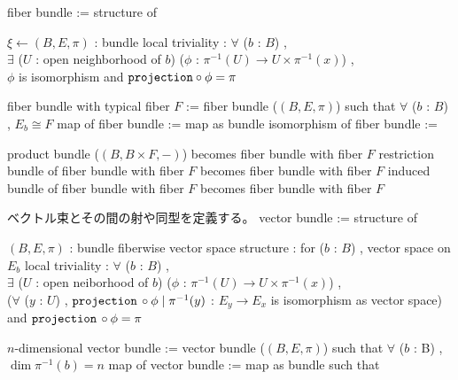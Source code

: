\begin{Definition}[ファイバー束とその間の射や同型]
\itemdefi
  \Define fiber bundle := structure of
  \begin{itemize}
    \itembase \(\xi \leftarrow (B , E , \pi)\) : bundle
    \itemwith local triviality :
      \(\forall\) (\(b\) : \(B\)) ,\\
      \(\exists\) (\(U\) : open neighborhood of \(b\)) (\(\phi\) : \(\pi^{-1}(U) \to U \times \pi^{-1}(x)\)) , \\
      \(\phi\) is isomorphism and \(\texttt{projection} \circ \phi = \pi\)
  \end{itemize}
\itemdefi
  \Define fiber bundle with typical fiber \(F\) := fiber bundle (\((B , E , \pi)\)) such that \(\forall\) (\(b\) : \(B\)) , \(E_b \cong F\)
\itemdefi
  \Define map of fiber bundle := map as bundle
\itemdefi
  \Define isomorphism of fiber bundle := 
\end{Definition}

\begin{Theorem}[ファイバー束と束に対する操作について]
\itemprop
  product bundle (\((B , B \times F , -)\)) becomes fiber bundle with fiber \(F\)
\itemprop
  restriction bundle of fiber bundle with fiber \(F\) becomes fiber bundle with fiber \(F\)
\itemprop
  induced bundle of fiber bundle with fiber \(F\) becomes fiber bundle with fiber \(F\)
\end{Theorem}

\begin{Definition}
\itemnote
  ベクトル束とその間の射や同型を定義する。
\itemdefi
  \Define vector bundle := structure of
  \begin{itemize}
    \itembase \((B , E , \pi)\) : bundle
    \itemenum fiberwise vector space structure :
      for (\(b\) : \(B\)) , vector space on \(E_b\)
    \itemwith local triviality :
      \(\forall\) (\(b\) : \(B\)) ,\\
      \(\exists\) (\(U\) : open neiborhood of \(b\)) (\(\phi\) : \(\pi^{-1}(U) \to U \times \pi^{-1}(x)\)) , \\
      (\(\forall\) (\(y\) : \(U\)) , \(\texttt{projection} \, \circ \phi \mid \pi^{-1}(y)\) : \(E_y \to E_x\) is isomorphism as vector space) and \(\texttt{projection} \, \circ \phi = \pi\)
  \end{itemize}
\itemdefi
  \Define \(n\)-dimensional vector bundle :=
  vector bundle (\((B , E , \pi)\)) such that \(\forall\) (\(b\) : B) , \(\dim \pi^{-1}(b) = n\)
\itemdefi
  \Define map of vector bundle := map as bundle such that 
\end{Definition}

